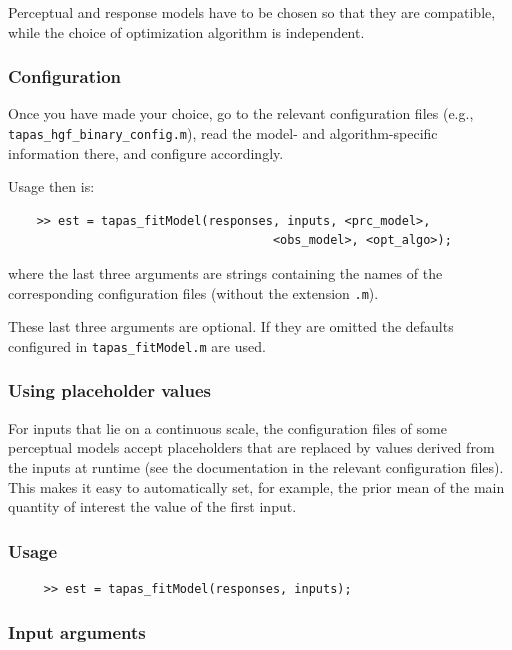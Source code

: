 \documentclass[11pt,a4paper]{article}
\numberwithin{equation}{section}
\begin{document}
Perceptual and response models have to be chosen so that they are
compatible, while the choice of optimization algorithm is
independent.

\subsubsection{Configuration}

Once you have made your choice, go to the relevant configuration files
(e.g., \linebreak\texttt{tapas\_hgf\_binary\_config.m}), read the model- and
algorithm-specific information there, and configure accordingly.

Usage then is:

\begin{verbatim}
    >> est = tapas_fitModel(responses, inputs, <prc_model>,
                                     <obs_model>, <opt_algo>);
\end{verbatim}

where the last three arguments are strings containing the names of the
corresponding configuration files (without the extension \texttt{.m}).

These last three arguments are optional. If they are omitted the
defaults configured in \texttt{tapas\_fitModel.m} are used.

\subsubsection{Using placeholder values}

For inputs that lie on a continuous scale, the configuration files of
some perceptual models accept placeholders that are replaced by values
derived from the inputs at runtime (see the documentation in the
relevant configuration files). This makes it easy to automatically
set, for example, the prior mean of the main quantity of interest the
value of the first input.

\subsubsection{Usage}

\begin{verbatim}
     >> est = tapas_fitModel(responses, inputs);
\end{verbatim}
 
\subsubsection{Input arguments}
\end{document}
